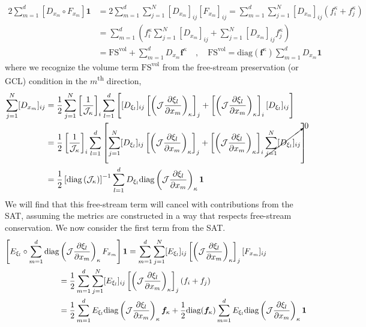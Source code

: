 \documentclass[12pt,a4paper]{article}
\newcommand{\pder}[2][]{\dfrac{\partial #1}{\partial #2}} %
\newcommand{\up}{\textsuperscript} %
\newcommand{\fn}[1]{\mathcal{#1}} %
\begin{document}
\begin{align*}
2 \sum_{m=1}^d \left[ D_{x_m} \circ F_{x_m} \right] \bm{1} &= 2 \sum_{m=1}^d \sum_{j=1}^N [D_{x_m}]_{ij} [ F_{x_m} ]_{ij} = \sum_{m=1}^d \sum_{j=1}^N [D_{x_m}]_{ij} (f_i^\kappa + f_j^\kappa) \\
& =  \sum_{m=1}^d \left( f_i^\kappa \sum_{j=1}^N [D_{x_m}]_{ij} + \sum_{j=1}^N [D_{x_m}]_{ij} f_j^\kappa \right)  \\
& = \text{FS}^{\text{vol}} + \sum_{m=1}^d D_{x_m} \bm{f}^\kappa \quad , \quad \text{FS}^{\text{vol}} =  \text{diag}(\bm{f}^\kappa) \sum_{m=1}^d D_{x_m} \bm{1}
\end{align*}
where we recognize the volume term $\text{FS}^{\text{vol}}$ from the free-stream preservation (or GCL) condition in the $m$\up{th} direction,
\begin{align*}
\sum_{j=1}^N [D_{x_m}]_{ij} &= \frac{1}{2} \sum_{j=1}^N \left[ \frac{1}{\fn{J}_\kappa} \right]_i \sum_{l=1}^d \left[ [D_{\xi_l}]_{ij} \left[ \left( \fn{J} \pder[\xi_l]{x_m} \right)_\kappa \right]_j + \left[ \left( \fn{J} \pder[\xi_l]{x_m} \right)_\kappa \right]_i  [ D_{\xi_l} ]_{ij} \right] \\
&= \frac{1}{2} \left[ \frac{1}{\fn{J}_\kappa} \right]_i \sum_{l=1}^d \left[ \sum_{j=1}^N [D_{\xi_l}]_{ij} \left[ \left( \fn{J} \pder[\xi_l]{x_m} \right)_\kappa \right]_j + \left[ \left( \fn{J} \pder[\xi_l]{x_m} \right)_\kappa \right]_i \cancelto{0}{\sum_{j=1}^N [ D_{\xi_l} ]_{ij}} \right] \\
&= \frac{1}{2}  \left[ \text{diag}\left( \fn{J}_\kappa \right) \right]^{-1} \sum_{l=1}^d  D_{\xi_l} \text{diag} \left( \fn{J} \pder[\xi_l]{x_m} \right)_\kappa \bm{1} 
\end{align*}
We will find that this free-stream term will cancel with contributions from the SAT, assuming the metrics are constructed in a way that respects free-stream conservation. We now consider the first term from the SAT.
\begin{align*}
\left[ E_{\xi_l} \circ \sum_{m=1}^d \text{diag}  \left( \fn{J} \pder[\xi_l]{x_m} \right)_{\kappa} F_{x_m}  \right] \bm{1} & = \sum_{m=1}^d \sum_{j=1}^N [E_{\xi_l}]_{ij} \left[ \left( \fn{J} \pder[\xi_l]{x_m} \right)_{\kappa} \right]_{j} [ F_{x_m} ]_{ij} \\
& \hspace{-3cm} = \frac{1}{2} \sum_{m=1}^d \sum_{j=1}^N [E_{\xi_l}]_{ij} \left[ \left( \fn{J} \pder[\xi_l]{x_m} \right)_{\kappa} \right]_{j} (f_i + f_j) \\
& \hspace{-3cm} = \frac{1}{2} \sum_{m=1}^d E_{\xi_l} \text{diag}  \left( \fn{J} \pder[\xi_l]{x_m} \right)_{\kappa} \bm{f}_\kappa + \frac{1}{2} \text{diag} (\bm{f}_\kappa) \sum_{m=1}^d E_{\xi_l} \text{diag}  \left( \fn{J} \pder[\xi_l]{x_m} \right)_{\kappa} \bm{1}
\end{align*}
\end{document}

